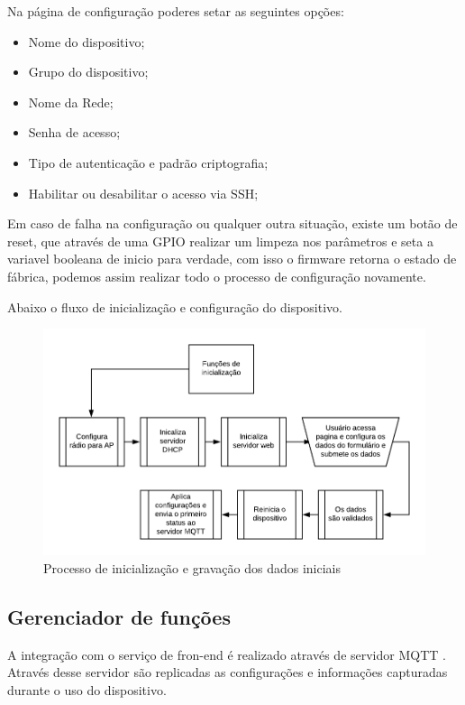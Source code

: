 \documentclass[openright]{normas-utf-tex} %
\begin{document}
Na página de configuração poderes setar as seguintes opções:
\begin{itemize}
    \item Nome do dispositivo;
    \item Grupo do dispositivo;
    \item Nome da Rede;
    \item Senha de acesso;
    \item Tipo de autenticação e padrão criptografia;
    \item Habilitar ou desabilitar o acesso via SSH;
\end{itemize}

Em caso de falha na configuração ou qualquer outra situação, existe um botão de reset, que através de uma GPIO \cite{Elsevier} realizar um limpeza nos parâmetros e seta a variavel booleana de inicio para verdade, com isso o firmware retorna o estado de fábrica, podemos assim realizar todo o processo de configuração novamente.

Abaixo o fluxo de inicialização e configuração do dispositivo.
\begin{figure}[!htb]
     \centering
     \includegraphics[scale=1]{Ini_flux.png}
     \caption{Processo de inicialização e gravação dos dados iniciais}
     \label{}
\end{figure}

\subsection{Gerenciador de funções}

A integração com o serviço de fron-end é realizado através de servidor MQTT \cite{Novatec}. Através desse servidor são replicadas as configurações e informações capturadas durante o uso do dispositivo. 
\end{document}
